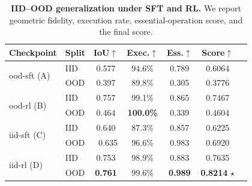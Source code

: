 \begin{table}[t]
\centering
\small
\setlength{\tabcolsep}{5pt}
\renewcommand{\arraystretch}{1.08}
\caption{\textbf{IID--OOD generalization under SFT and RL.}
We report geometric fidelity, execution rate, essential-operation score, and the final score.}
\label{tab:iid_ood}
\begin{tabular}{@{}llccccc@{}}
\toprule
Checkpoint & Split & IoU$\uparrow$ & Exec.$\uparrow$ & Ess.$\uparrow$ & Score$\uparrow$ \\
\midrule
\multirow{2}{*}{ood-sft (A)}
& IID  & 0.577 & 94.6\% & 0.789 & 0.6064 \\
& OOD  & 0.397 & 89.8\% & 0.305 & 0.3776 \\
\midrule
\multirow{2}{*}{ood-rl (B)}
& IID & 0.757 & 99.1\%  & 0.865 & 0.7467 \\
& OOD  & 0.464 & \textbf{100.0\%} & 0.339 & 0.4604 \\
\midrule
\multirow{2}{*}{iid-sft (C)}
& IID & 0.640 & 87.3\% & 0.857 &  0.6225 \\
& OOD  & \ 0.635 & 96.6\% & 0.983 & 0.6920 \\
\midrule
\multirow{2}{*}{iid-rl (D)}
& IID & 0.753 & 98.9\% & 0.883 & 0.7635 \\
& OOD & \textbf{0.761} & 99.6\% & \textbf{0.989} & \textbf{0.8214} $\star$ \\
\bottomrule
\end{tabular}
\end{table}
